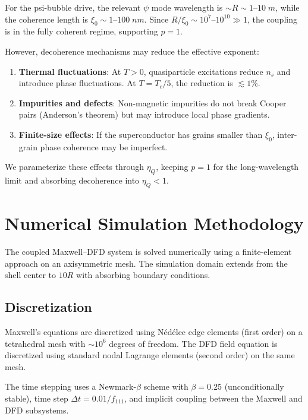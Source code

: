 \documentclass[twocolumn,prl,superscriptaddress,nofootinbib,longbibliography,floatfix]{revtex4-2}
\begin{document}
For the psi-bubble drive, the relevant $\psi$ mode wavelength is
$\sim R \sim 1$--$10\;\si{m}$, while the coherence length is
$\xi_0 \sim 1$--$100\;\si{nm}$.  Since
$R/\xi_0 \sim 10^7$--$10^{10} \gg 1$, the coupling is in the fully
coherent regime, supporting $p = 1$.

However, decoherence mechanisms may reduce the effective exponent:
\begin{enumerate}[nosep]
\item \textbf{Thermal fluctuations}: At $T > 0$, quasiparticle
excitations reduce $n_s$ and introduce phase fluctuations.  At
$T = T_c/5$, the reduction is $\lesssim 1\%$.
\item \textbf{Impurities and defects}: Non-magnetic impurities do not
break Cooper pairs (Anderson's theorem) but may introduce local phase
gradients.
\item \textbf{Finite-size effects}: If the superconductor has grains
smaller than $\xi_0$, inter-grain phase coherence may be imperfect.
\end{enumerate}

We parameterize these effects through $\eta_Q$, keeping $p = 1$ for the
long-wavelength limit and absorbing decoherence into
$\eta_Q < 1$.

\section{Numerical Simulation Methodology}\label{app:numerical}

The coupled Maxwell--DFD system is solved numerically using a
finite-element approach on an axisymmetric mesh.  The simulation domain
extends from the shell center to $10R$ with absorbing boundary
conditions.

\subsection{Discretization}

Maxwell's equations are discretized using N\'{e}d\'{e}lec edge elements
(first order) on a tetrahedral mesh with $\sim 10^6$ degrees of
freedom.  The DFD field equation is discretized using standard nodal
Lagrange elements (second order) on the same mesh.

The time stepping uses a Newmark-$\beta$ scheme with $\beta = 0.25$
(unconditionally stable), time step $\Delta t = 0.01/f_{111}$, and
implicit coupling between the Maxwell and DFD subsystems.
\end{document}
